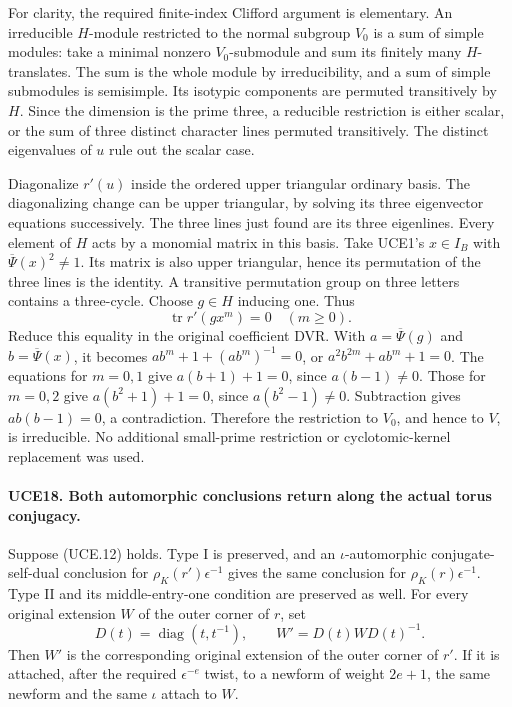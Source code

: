 \documentclass[11pt,a4paper]{article}
\numberwithin{equation}{section}
\theoremstyle{remark}\newtheorem{remark}[theorem]{Remark}
\begin{document}
For clarity, the required finite-index Clifford argument is
elementary.  An irreducible \(H\)-module restricted to the normal
subgroup \(V_0\) is a sum of simple modules: take a minimal
nonzero \(V_0\)-submodule and sum its finitely many \(H\)-translates.
The sum is the whole module by irreducibility, and a sum of simple
submodules is semisimple.  Its isotypic components are permuted
transitively by \(H\).  Since the dimension is the prime three,
a reducible restriction is either scalar, or the sum of three
distinct character lines permuted transitively.  The distinct
eigenvalues of \(u\) rule out the scalar case.

Diagonalize \(r'(u)\) inside the ordered upper triangular
ordinary basis.  The diagonalizing change can be upper triangular,
by solving its three eigenvector equations successively.  The
three lines just found are its three eigenlines.  Every element
of \(H\) acts by a monomial matrix in this basis.
Take UCE1's \(x\in I_B\) with
\(\overline\Psi(x)^2\ne1\).  Its matrix is also upper
triangular, hence its permutation of the three lines is the
identity.  A transitive permutation group on three letters contains
a three-cycle.  Choose \(g\in H\) inducing one.  Thus
\[
                        \operatorname{tr}r'(gx^m)=0
                                      \quad(m\ge0).
 \tag{UCE.13}
\]
Reduce this equality in the original coefficient DVR.  With
\(a=\overline\Psi(g)\) and \(b=\overline\Psi(x)\), it becomes
\(ab^m+1+(ab^m)^{-1}=0\), or
\(a^2b^{2m}+ab^m+1=0\).  The equations for \(m=0,1\)
give \(a(b+1)+1=0\), since \(a(b-1)\ne0\).
Those for \(m=0,2\) give \(a(b^2+1)+1=0\), since
\(a(b^2-1)\ne0\).  Subtraction gives
\(ab(b-1)=0\), a contradiction.  Therefore the restriction
to \(V_0\), and hence to \(V\), is irreducible.
No additional small-prime restriction or cyclotomic-kernel
replacement was used.

\paragraph{UCE18. Both automorphic conclusions return along the actual torus conjugacy.}
\label{claim:UCE18}
Suppose (UCE.12) holds.  Type I is preserved, and an
\(\iota\)-automorphic conjugate-self-dual conclusion for
\(\rho_K(r')\epsilon^{-1}\) gives the same conclusion for
\(\rho_K(r)\epsilon^{-1}\).  Type II and its middle-entry-one
condition are preserved as well.  For every original extension
\(W\) of the outer corner of \(r\), set
\[
 D(t)=\operatorname{diag}(t,t^{-1}),\qquad
                         W'=D(t)WD(t)^{-1}.
 \tag{UCE.14}
\]
Then \(W'\) is the corresponding original extension of the
outer corner of \(r'\).  If it is attached, after the required
\(\epsilon^{-e}\) twist, to a newform of weight \(2e+1\),
the same newform and the same \(\iota\) attach to \(W\).
\end{document}
